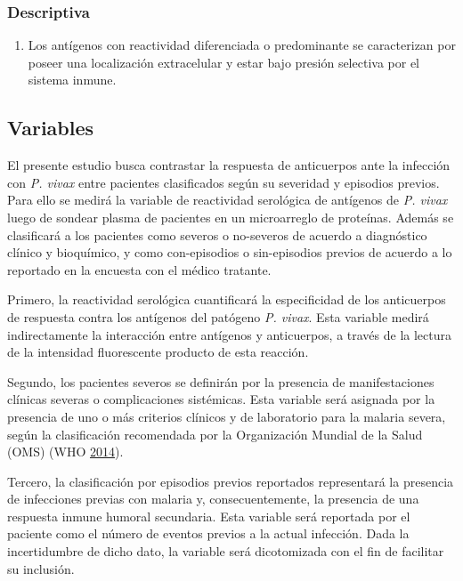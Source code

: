 \documentclass[
  a4paper]{article}
\providecommand{\tightlist}{%
  \setlength{\itemsep}{0pt}\setlength{\parskip}{0pt}}
\begin{document}
\hypertarget{descriptiva}{%
\subsubsection{Descriptiva}\label{descriptiva}}

\begin{enumerate}
\def\labelenumi{\arabic{enumi}.}
\setcounter{enumi}{2}
\tightlist
\item
  Los antígenos con reactividad diferenciada o predominante se
  caracterizan por poseer una localización extracelular y estar bajo
  presión selectiva por el sistema inmune.
\end{enumerate}

\hypertarget{variables}{%
\subsection{Variables}\label{variables}}

El presente estudio busca contrastar la respuesta de anticuerpos ante la
infección con \emph{P. vivax} entre pacientes clasificados según su
severidad y episodios previos. Para ello se medirá la variable de
reactividad serológica de antígenos de \emph{P. vivax} luego de sondear
plasma de pacientes en un microarreglo de proteínas. Además se
clasificará a los pacientes como severos o no-severos de acuerdo a
diagnóstico clínico y bioquímico, y como con-episodios o sin-episodios
previos de acuerdo a lo reportado en la encuesta con el médico tratante.

Primero, la reactividad serológica cuantificará la especificidad de los
anticuerpos de respuesta contra los antígenos del patógeno \emph{P.
vivax}. Esta variable medirá indirectamente la interacción entre
antígenos y anticuerpos, a través de la lectura de la intensidad
fluorescente producto de esta reacción.

Segundo, los pacientes severos se definirán por la presencia de
manifestaciones clínicas severas o complicaciones sistémicas. Esta
variable será asignada por la presencia de uno o más criterios clínicos
y de laboratorio para la malaria severa, según la clasificación
recomendada por la Organización Mundial de la Salud (OMS) (WHO
\protect\hyperlink{ref-WHO2014severe}{2014}).

Tercero, la clasificación por episodios previos reportados representará
la presencia de infecciones previas con malaria y, consecuentemente, la
presencia de una respuesta inmune humoral secundaria. Esta variable será
reportada por el paciente como el número de eventos previos a la actual
infección. Dada la incertidumbre de dicho dato, la variable será
dicotomizada con el fin de facilitar su inclusión.
\end{document}

